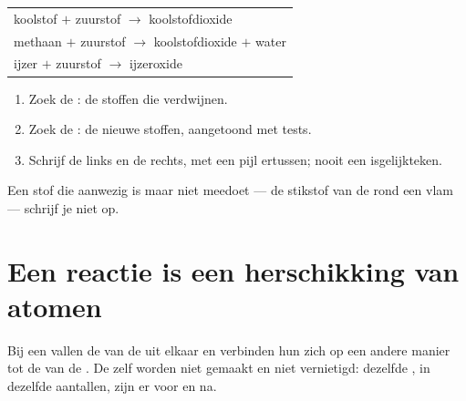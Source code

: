 \begin{example}\label{ex:g7:chemical-reactions:three}
\begin{center}
\begin{tabular}{l}
koolstof $+$ zuurstof $\longrightarrow$ koolstofdioxide\\[2pt]
methaan $+$ zuurstof $\longrightarrow$ koolstofdioxide $+$ water\\[2pt]
ijzer $+$ zuurstof $\longrightarrow$ ijzeroxide
\end{tabular}
\end{center}
\end{example}

\begin{method}\label{met:g7:chemical-reactions:write}
\begin{enumerate}
  \item Zoek de : de stoffen die verdwijnen.
  \item Zoek de : de nieuwe stoffen, aangetoond met
        tests.
  \item Schrijf de  links en de  rechts, met
        een pijl ertussen; nooit een isgelijkteken.
\end{enumerate}
Een stof die aanwezig is maar niet meedoet --- de stikstof van de 
rond een vlam --- schrijf je niet op.
\end{method}

\section{Een reactie is een herschikking van atomen}

\begin{proposition}\label{prop:g7:chemical-reactions:rearranged}
Bij een  vallen de  van de  uit
elkaar en verbinden hun  zich op een andere manier tot de
 van de . De  zelf worden niet gemaakt en
niet vernietigd: dezelfde , in dezelfde aantallen, zijn er voor en
na.
\end{proposition}

